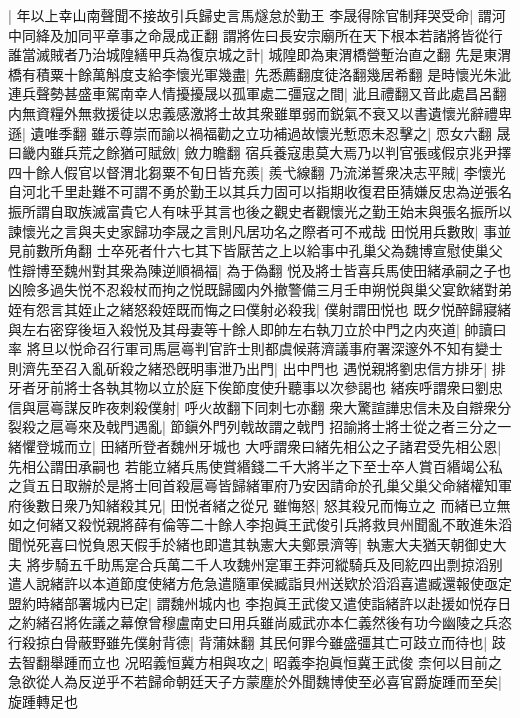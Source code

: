|{
	年以上幸山南聲聞不接故引兵歸史言馬燧怠於勤王}
李晟得除官制拜哭受命|{
	謂河中同絳及加同平章事之命晟成正翻}
謂將佐曰長安宗廟所在天下根本若諸將皆從行誰當滅賊者乃治城隍繕甲兵為復京城之計|{
	城隍即為東渭橋營塹治直之翻}
先是東渭橋有積粟十餘萬斛度支給李懷光軍幾盡|{
	先悉薦翻度徒洛翻幾居希翻}
是時懷光朱泚連兵聲勢甚盛車駕南幸人情擾擾晟以孤軍處二彊寇之間|{
	泚且禮翻又音此處昌呂翻}
内無資糧外無救援徒以忠義感激將士故其衆雖單弱而鋭氣不衰又以書遺懷光辭禮卑遜|{
	遺唯季翻}
雖示尊崇而諭以禍福勸之立功補過故懷光慙恧未忍擊之|{
	恧女六翻}
晟曰畿内雖兵荒之餘猶可賦斂|{
	斂力瞻翻}
宿兵養寇患莫大焉乃以判官張彧假京兆尹擇四十餘人假官以督渭北芻粟不旬日皆充羨|{
	羨弋線翻}
乃流涕誓衆决志平賊|{
	李懷光自河北千里赴難不可謂不勇於勤王以其兵力固可以指期收復君臣猜嫌反忠為逆張名振所謂自取族滅富貴它人有味乎其言也後之觀史者觀懷光之勤王始末與張名振所以諫懷光之言與夫史家歸功李晟之言則凡居功名之際者可不戒哉}
田悦用兵數敗|{
	事並見前數所角翻}
士卒死者什六七其下皆厭苦之上以給事中孔巢父為魏博宣慰使巢父性辯博至魏州對其衆為陳逆順禍福|{
	為于偽翻}
悦及將士皆喜兵馬使田緒承嗣之子也凶險多過失悦不忍殺杖而拘之悦既歸國内外撤警備三月壬申朔悦與巢父宴飲緒對弟姪有怨言其姪止之緒怒殺姪既而悔之曰僕射必殺我|{
	僕射謂田悦也}
既夕悦醉歸寢緒與左右密穿後垣入殺悦及其母妻等十餘人即帥左右執刀立於中門之内夾道|{
	帥讀曰率}
將旦以悦命召行軍司馬扈㠋判官許士則都虞候蔣濟議事府署深邃外不知有變士則濟先至召入亂斫殺之緒恐旣明事泄乃出門|{
	出中門也}
遇悦親將劉忠信方排牙|{
	排牙者牙前將士各執其物以立於庭下俟節度使升聽事以次參謁也}
緒疾呼謂衆曰劉忠信與扈㠋謀反昨夜刺殺僕射|{
	呼火故翻下同刺七亦翻}
衆大驚諠譁忠信未及自辯衆分裂殺之扈㠋來及戟門遇亂|{
	節鎭外門列戟故謂之戟門}
招諭將士將士從之者三分之一緒懼登城而立|{
	田緒所登者魏州牙城也}
大呼謂衆曰緒先相公之子諸君受先相公恩|{
	先相公謂田承嗣也}
若能立緒兵馬使賞緡錢二千大將半之下至士卒人賞百緡竭公私之貨五日取辦於是將士囘首殺扈㠋皆歸緒軍府乃安因請命於孔巢父巢父命緒權知軍府後數日衆乃知緒殺其兄|{
	田悦者緒之從兄}
雖悔怒|{
	怒其殺兄而悔立之}
而緒已立無如之何緒又殺悦親將薛有倫等二十餘人李抱眞王武俊引兵將救貝州聞亂不敢進朱滔聞悦死喜曰悦負恩天假手於緒也即遣其執憲大夫鄭景濟等|{
	執憲大夫猶天朝御史大夫}
將步騎五千助馬寔合兵萬二千人攻魏州寔軍王莽河縱騎兵及囘紇四出剽掠滔别遣人說緒許以本道節度使緒方危急遣隨軍侯臧詣貝州送欵於滔滔喜遣臧還報使亟定盟約時緒部署城内已定|{
	謂魏州城内也}
李抱眞王武俊又遣使詣緒許以赴援如悦存日之約緒召將佐議之幕僚曾穆盧南史曰用兵雖尚威武亦本仁義然後有功今幽陵之兵恣行殺掠白骨蔽野雖先僕射背德|{
	背蒲妹翻}
其民何罪今雖盛彊其亡可跂立而待也|{
	跂去智翻舉踵而立也}
况昭義恒冀方相與攻之|{
	昭義李抱眞恒冀王武俊}
柰何以目前之急欲從人為反逆乎不若歸命朝廷天子方蒙塵於外聞魏博使至必喜官爵旋踵而至矣|{
	旋踵轉足也}

